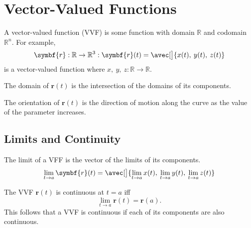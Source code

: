\documentclass{article}
\begin{document}
\section{Vector-Valued Functions}
\begin{definition}
    A vector-valued function (VVF) is some function
    with domain $\mathbb{R}$ and codomain $\mathbb{R}^n$.
    For example, 
    \begin{equation*}
        \symbf{r}:\mathbb{R}\to\mathbb{R}^3
        :\symbf{r}(t)=\avec[\big]{x(t),\: y(t),\: z(t)}
    \end{equation*}
    is a vector-valued function where $x,\:y,\:z: \mathbb{R}\to\mathbb{R}$.
\end{definition}
\begin{theorem}
    The domain of $\symbf{r}(t)$ is the intersection of the domains
    of its components.
\end{theorem}
\begin{definition}[Orientation]
    The orientation of $\symbf{r}(t)$ is the direction of motion along the 
    curve as the value of the parameter increases.
\end{definition}
\subsection{Limits and Continuity}
\begin{theorem}
    The limit of a VFF is the vector of the limits of its components.
    \begin{equation*}
        \lim_{t\to a} \symbf{r}(t)
        = \avec[\big]{\lim_{t\to a} x(t),\: \lim_{t\to a} y(t),\: \lim_{t\to a} z(t)}
    \end{equation*}
\end{theorem}
\begin{theorem}
    The VVF $\symbf{r}(t)$ is continuous at $t=a$ iff 
    \begin{equation*}
        \lim_{t\to a} \symbf{r}(t) = \symbf{r}(a).
    \end{equation*}
    This follows that a VVF is continuous if each of its components are also continuous. 
\end{theorem}
\end{document}
